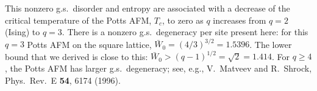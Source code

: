 This nonzero g.s.\ disorder and entropy are associated with a decrease of the critical temperature of the Potts AFM, $T_c$,
to zero as $q$ increases from $q = 2$ (Ising) to $q = 3$. There is a nonzero g.s.\ degeneracy per site present here: for
this $q = 3$ Potts AFM on the square lattice, $\bar W_0 = (4/3)^{3/2} = 1.5396$. The lower bound that we derived is
close to this: $\bar W_0>(q-1)^{1/2} = \sqrt2 = 1.414$. For $q\ge 4$, the Potts AFM has larger g.s.\ degeneracy; see,
e.g., V.~Matveev and R.~Shrock, Phys.\ Rev.\ E \textbf{54}, 6174 (1996).
